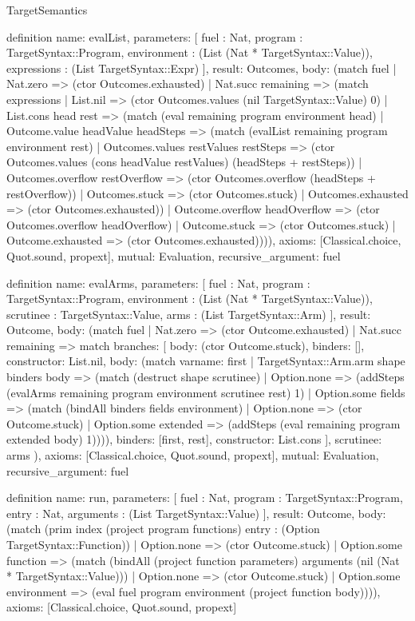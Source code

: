 \begin{lexlean}{TargetSemantics}
\begin{semanticmodule}
definition{
  name: evalList,
  parameters: [
    fuel : Nat,
    program : TargetSyntax::Program,
    environment : (List (Nat * TargetSyntax::Value)),
    expressions : (List TargetSyntax::Expr)
  ],
  result: Outcomes,
  body: (match fuel
    | Nat.zero => (ctor Outcomes.exhausted)
    | Nat.succ remaining => (match expressions
      | List.nil => (ctor Outcomes.values (nil TargetSyntax::Value) 0)
      | List.cons head rest => (match (eval remaining program environment head)
        | Outcome.value headValue headSteps => (match (evalList remaining program environment rest)
          | Outcomes.values restValues restSteps => (ctor Outcomes.values (cons headValue restValues) (headSteps + restSteps))
          | Outcomes.overflow restOverflow => (ctor Outcomes.overflow (headSteps + restOverflow))
          | Outcomes.stuck => (ctor Outcomes.stuck)
          | Outcomes.exhausted => (ctor Outcomes.exhausted))
        | Outcome.overflow headOverflow => (ctor Outcomes.overflow headOverflow)
        | Outcome.stuck => (ctor Outcomes.stuck)
        | Outcome.exhausted => (ctor Outcomes.exhausted)))),
  axioms: [Classical.choice, Quot.sound, propext],
  mutual: Evaluation,
  recursive_argument: fuel
}

definition{
  name: evalArms,
  parameters: [
    fuel : Nat,
    program : TargetSyntax::Program,
    environment : (List (Nat * TargetSyntax::Value)),
    scrutinee : TargetSyntax::Value,
    arms : (List TargetSyntax::Arm)
  ],
  result: Outcome,
  body: (match fuel
    | Nat.zero => (ctor Outcome.exhausted)
    | Nat.succ remaining => match{
      branches: [
        {body: (ctor Outcome.stuck), binders: [], constructor: List.nil},
        {
          body: (match var{name: first}
            | TargetSyntax::Arm.arm shape binders body => (match (destruct shape scrutinee)
              | Option.none => (addSteps (evalArms remaining program environment scrutinee rest) 1)
              | Option.some fields => (match (bindAll binders fields environment)
                | Option.none => (ctor Outcome.stuck)
                | Option.some extended => (addSteps (eval remaining program extended body) 1)))),
          binders: [first, rest],
          constructor: List.cons
        }
      ],
      scrutinee: arms
    }),
  axioms: [Classical.choice, Quot.sound, propext],
  mutual: Evaluation,
  recursive_argument: fuel
}

definition{
  name: run,
  parameters: [
    fuel : Nat,
    program : TargetSyntax::Program,
    entry : Nat,
    arguments : (List TargetSyntax::Value)
  ],
  result: Outcome,
  body: (match (prim index (project program functions) entry : (Option TargetSyntax::Function))
    | Option.none => (ctor Outcome.stuck)
    | Option.some function => (match (bindAll (project function parameters) arguments (nil (Nat * TargetSyntax::Value)))
      | Option.none => (ctor Outcome.stuck)
      | Option.some environment => (eval fuel program environment (project function body)))),
  axioms: [Classical.choice, Quot.sound, propext]
}
\end{semanticmodule}
\end{lexlean}
